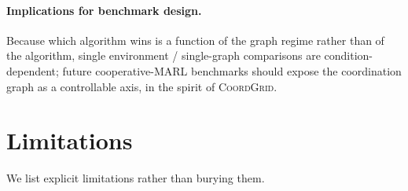 \documentclass[10pt]{article}
\newcommand{\coordgrid}{\textsc{CoordGrid}}
\begin{document}
\paragraph{Implications for benchmark design.} Because which algorithm wins
is a function of the graph regime rather than of the algorithm, single
environment / single-graph comparisons are condition-dependent; future
cooperative-MARL benchmarks should expose the coordination graph as a
controllable axis, in the spirit of \coordgrid.

\section{Limitations}
\label{sec:limitations}

We list explicit limitations rather than burying them.
\end{document}
